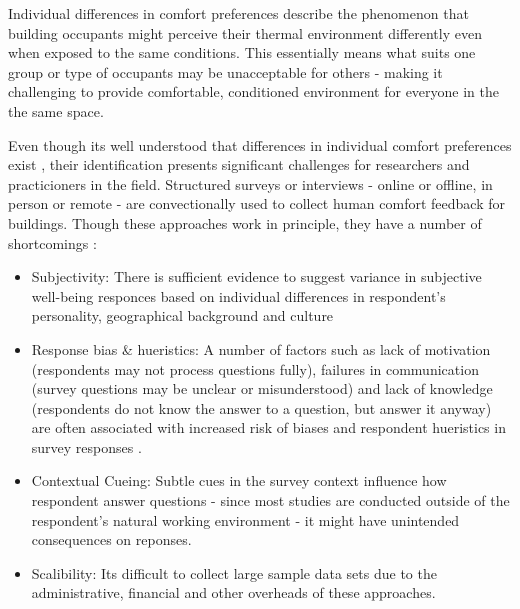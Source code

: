 

Individual differences in comfort preferences describe the phenomenon that building occupants might perceive their thermal environment differently even when exposed to the same conditions. This essentially means what suits one group or type of occupants may be unacceptable for others - making it challenging to provide comfortable, conditioned environment for everyone in the the same space.

Even though its well understood that differences in individual comfort preferences exist \cite{WANG2018181}, their identification presents significant challenges for researchers and practicioners in the field. Structured surveys or interviews - online or offline, in person or remote - are convectionally used to collect human comfort feedback for buildings. Though these approaches work in principle, they have a number of shortcomings \cite{organisationforeconomicco-operationanddevelopment(oecd)_2013}:  

\begin{itemize}
  \item Subjectivity: There is sufficient evidence to suggest variance in subjective well-being responces based on individual differences in respondent's personality, geographical background and culture \cite{doi:10.1146/annurev.psych.54.101601.145056}
  \item Response bias \& hueristics: A number of factors such as lack of motivation (respondents may not process questions fully), failures in communication (survey questions may be unclear or misunderstood) and lack of knowledge (respondents do not know the answer to a question, but answer it anyway) are often associated with increased risk of biases and respondent hueristics in survey responses \cite{bradburn2004asking}.
  \item Contextual Cueing: Subtle cues in the survey context influence how respondent answer questions \cite{krosnick1997seymour} - since most studies are conducted outside of the respondent's natural working environment - it might have unintended consequences on reponses. 
  \item Scalibility: Its difficult to collect large sample data sets due to the administrative, financial and other overheads of these approaches.
\end{itemize}


